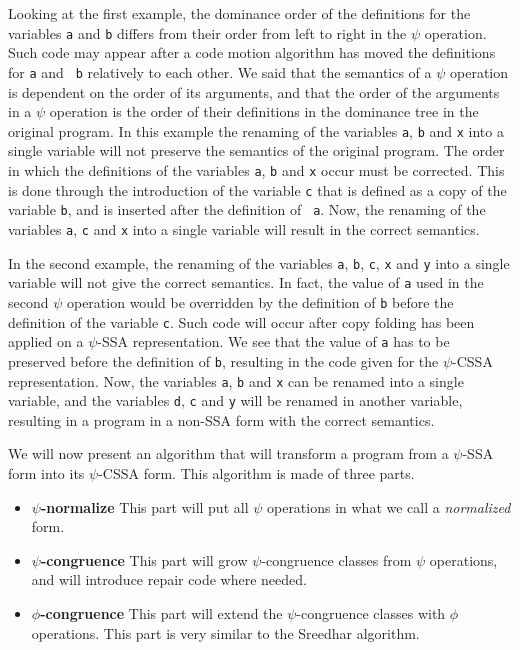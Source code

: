 
Looking at the first example, the dominance order of the definitions
for the variables {\tt a} and {\tt b} differs from their order from
left to right in the $\psi$ operation. Such code may appear after a
code motion algorithm has moved the definitions for {\tt a} and {\tt
b} relatively to each other. We said that the semantics of a
$\psi$ operation is dependent on the order of its arguments, and that
the order of the arguments in a $\psi$ operation is the order of their
definitions in the dominance tree in the original program. In this
example the renaming of the variables {\tt a}, {\tt b} and {\tt x}
into a single variable will not preserve the semantics of the original
program. The order in which the definitions of the variables {\tt a},
{\tt b} and {\tt x} occur must be corrected. This is done through the
introduction of the variable {\tt c} that is defined as a copy of the
variable {\tt b}, and is inserted after the definition of {\tt
a}. Now, the renaming of the variables {\tt a}, {\tt c} and {\tt x}
into a single variable will result in the correct semantics.

In the second example, the renaming of the variables {\tt a}, {\tt b},
{\tt c}, {\tt x} and {\tt y} into a single variable will not give the
correct semantics. In fact, the value of {\tt a} used in the second
$\psi$ operation would be overridden by the definition of {\tt b}
before the definition of the variable {\tt c}. Such code will occur
after copy folding has been applied on a $\psi$-SSA representation. We
see that the value of {\tt a} has to be preserved before the
definition of {\tt b}, resulting in the code given for the $\psi$-CSSA
representation. Now, the variables {\tt a}, {\tt b} and {\tt x} can be
renamed into a single variable, and the variables {\tt d}, {\tt c} and
{\tt y} will be renamed in another variable, resulting in a program in
a non-SSA form with the correct semantics.

We will now present an algorithm that will transform a program from a
$\psi$-SSA form into its $\psi$-CSSA form. This algorithm is made of
three parts.

\begin{itemize}
\item {\bf $\psi$-normalize} This part will put all $\psi$ operations
in what we call a {\em normalized} form.
\item {\bf $\psi$-congruence} This part will grow $\psi$-congruence
classes from $\psi$ operations, and will introduce repair code where
needed.
\item {\bf $\phi$-congruence} This part will extend the
$\psi$-congruence classes with $\phi$ operations. This part is very
similar to the Sreedhar algorithm.
\end{itemize}

